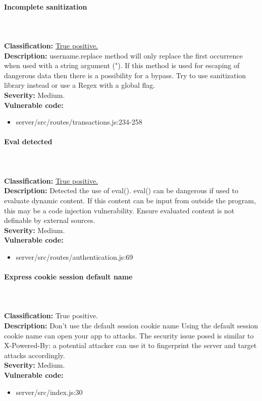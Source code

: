 \documentclass[]{article}
\begin{document}
\paragraph{Incomplete sanitization} \mbox{} \\ \\
\textbf{Classification:} \hyperref[subsubsec:improper_limitation_of_a_pathname_to_a_restricted_directory]{True positive.} \\ 
\textbf{Description:} username.replace method will only replace the first occurrence when used with a string argument ("). 
If this method is used for escaping of dangerous data then there is a possibility for a bypass. Try to use sanitization 
library instead or use a Regex with a global flag. \\ 
\textbf{Severity:} Medium. \\ 
\textbf{Vulnerable code:} 
\begin{itemize}
    \item server/src/routes/transactions.js:234-258
\end{itemize}

\paragraph{Eval detected} \mbox{} \\ \\
\textbf{Classification:} \hyperref[subsubsec:improper_neutralization_of_directives_in_dynamically_evaluated_code]{True positive.} \\ 
\textbf{Description:} Detected the use of eval(). eval() can be dangerous if used to evaluate dynamic content. If this 
content can be input from outside the program, this may be a code injection vulnerability. Ensure evaluated content is 
not definable by external sources. \\ 
\textbf{Severity:} Medium. \\ 
\textbf{Vulnerable code:} 
\begin{itemize}
    \item server/src/routes/authentication.js:69
\end{itemize}

\paragraph{Express cookie session default name} \mbox{} \\ \\
\textbf{Classification:} True positive. \\ 
\textbf{Description:} Don't use the default session cookie name Using the default session cookie name can open your 
app to attacks. The security issue posed is similar to X-Powered-By: a potential attacker can use it to fingerprint 
the server and target attacks accordingly. \\ 
\textbf{Severity:} Medium. \\ 
\textbf{Vulnerable code:} 
\begin{itemize}
    \item server/src/index.js:30
\end{itemize}
\end{document}
